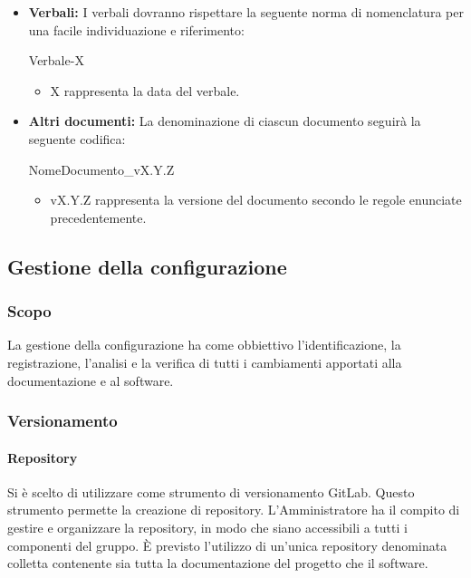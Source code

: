 \documentclass[11pt,a4paper]{article}
\begin{document}
{	\begin{itemize}
		\item \textbf{Verbali:} I verbali dovranno rispettare la seguente norma di nomenclatura per una facile individuazione e riferimento:
		\begin{center}
			Verbale-X
		\end{center}
		
		\begin{itemize}
			\item X rappresenta la data del verbale.
		\end{itemize}
		
		\item \textbf{Altri documenti:} La denominazione di ciascun documento seguirà la seguente codifica:
		\begin{center}
			NomeDocumento\_vX.Y.Z
		\end{center}
		
		\begin{itemize}
			\item vX.Y.Z rappresenta la versione del documento secondo le regole enunciate precedentemente.
		\end{itemize}
		
	\end{itemize}
	

\subsection{Gestione della configurazione}
\subsubsection{Scopo}
La gestione della configurazione ha come obbiettivo l'identificazione, la registrazione, l'analisi e la verifica di tutti i cambiamenti apportati alla documentazione e al software.
\subsubsection{Versionamento}
\paragraph{Repository}
Si è scelto di utilizzare come strumento di versionamento GitLab. Questo strumento permette la creazione di repository.
L'Amministratore ha il compito di gestire e organizzare la repository, in modo che siano accessibili a tutti i componenti del gruppo.
È previsto l'utilizzo di un'unica repository denominata colletta contenente sia tutta la documentazione del progetto che il software.
}
\end{document}
